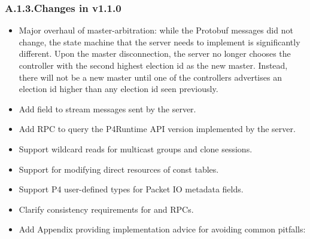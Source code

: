 \documentclass[11pt]{article}
\begin{document}
{%
\subsubsection{A.1.3.\hspace*{0.5em}Changes in v1.1.0}\label{sec-changes-in-v110}%

\begin{itemize}[noitemsep,topsep=\mdcompacttopsep]%

\item{}Major overhaul of master-arbitration: while the Protobuf messages did not
change, the state machine that the server needs to implement is significantly
different. Upon the master disconnection, the server no longer chooses the
controller with the second highest election id as the new master. Instead,
there will not be a new master until one of the controllers advertises an
election id higher than any election id seen previously.%

\item{}Add  field to stream messages sent by the server.%

\item{}Add  RPC to query the P4Runtime API version implemented by the
server.%

\item{}Support wildcard reads for multicast groups and clone sessions.%

\item{}Support for modifying direct resources of const tables.%

\item{}Support P4 user-defined types for Packet IO metadata fields.%

\item{}Clarify consistency requirements for  and  RPCs.%

\item{}Add Appendix providing implementation advice for avoiding common pitfalls:


\end{itemize}}
\end{document}
